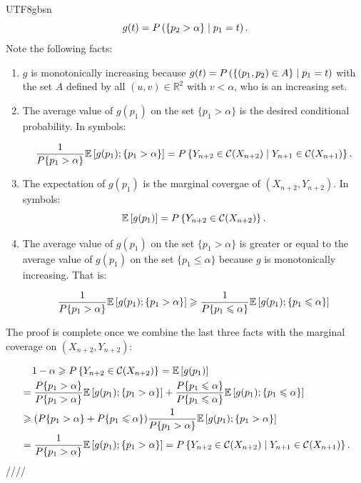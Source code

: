 \documentclass[../../main.tex]{subfiles}
\begin{document}
\begin{CJK*}{UTF8}{gbsn}
\begin{equation*}
    g(t) = P \bracket{ \curly{p_2 > \alpha} \mid p_1 = t}.
\end{equation*}
Note the following facts:

\begin{enumerate}
    \item $g$ is monotonically increasing because 
$g(t) = P \bracket{\curly{(p_1,p_2)\in A} \mid p_1 = t}$
with the set $A$ defined by all $(u,v) \in \mathbb{R}^2$ 
with $v < \alpha$, who is an increasing set.
    \item The average value of $g(p_1)$ on the set 
    $\{p_1 > \alpha\}$ is the desired conditional probability.
    In symbols:

    \begin{equation*}
        \frac{1}{P\{p_1 > \alpha\}} \mathbb{E} \squared{g(p_1); \curly{p_1 > \alpha}}
        = P\curly{Y_{n+2}\in\mathcal{C}(X_{n+2}) \mid Y_{n+1}\in\mathcal{C}(X_{n+1}) }.
    \end{equation*}
    \item The expectation of $g(p_1)$ is the marginal covergae of $(X_{n+2}, Y_{n+2})$.
    In symbols:
    \begin{equation*}
        \mathbb{E} \squared{g(p_1)}
        = P\curly{Y_{n+2}\in\mathcal{C}(X_{n+2})}.
    \end{equation*}
    \item The average value of $g(p_1)$ on the set $\{p_1 > \alpha\}$
    is greater or equal to the average value of $g(p_1)$ on the set 
    $\{p_1 \leqslant \alpha\}$ because $g$ is monotonically increasing.
    That is:

    \begin{equation*}
        \frac{1}{P\{p_1 > \alpha\}} \mathbb{E} \squared{g(p_1); \curly{p_1 > \alpha}}
        \geqslant \frac{1}{P\{p_1 \leqslant \alpha\}} 
        \mathbb{E} \squared{g(p_1); \curly{p_1 \leqslant \alpha}}
    \end{equation*}
\end{enumerate}
The proof is complete once we combine the last three facts 
with the marginal coverage on $(X_{n+2},Y_{n+2})$:

\begin{equation*}
    \begin{split}
    & \tab[0.4cm] 1- \alpha \geqslant P\curly{Y_{n+2}\in\mathcal{C}(X_{n+2})}
    = \mathbb{E} \squared{g(p_1)} 
    \\ & = \frac{P\{p_1 > \alpha\}}{P\{p_1 > \alpha\}} \mathbb{E} \squared{g(p_1); \curly{p_1 > \alpha}}
    + \frac{P\{p_1 \leqslant \alpha\}}{P\{p_1 \leqslant \alpha\}} 
        \mathbb{E} \squared{g(p_1); \curly{p_1 \leqslant \alpha}}
    \\ & \geqslant 
    (P\{p_1 > \alpha\} + P\{p_1 \leqslant \alpha\})
    \frac{1}{P\{p_1 > \alpha\}} \mathbb{E} \squared{g(p_1); \curly{p_1 > \alpha}}
    \\ & = \frac{1}{P\{p_1 > \alpha\}} \mathbb{E} \squared{g(p_1); \curly{p_1 > \alpha}}
    = P\curly{Y_{n+2}\in\mathcal{C}(X_{n+2}) \mid Y_{n+1}\in\mathcal{C}(X_{n+1}) }.
    \end{split}
\end{equation*}
////

\end{CJK*}
\end{document}
